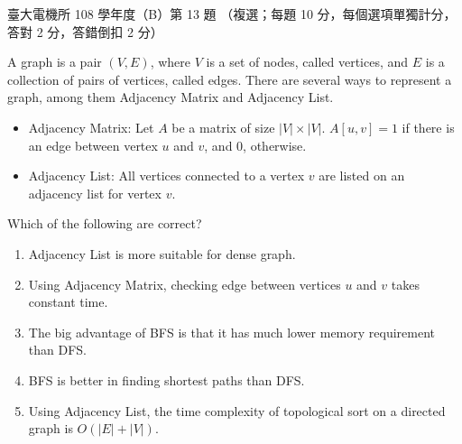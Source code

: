 \begin{pastexam}[label={px:ntu-108-ee-dsb-13}]{臺大電機所 108 學年度（B）第 13 題}
（複選；每題 10 分，每個選項單獨計分，答對 2 分，答錯倒扣 2 分）

A graph is a pair $(V,E)$, where $V$ is a set of nodes, called vertices, and $E$ is a collection of
pairs of vertices, called edges. There are several ways to represent a graph, among them Adjacency
Matrix and Adjacency List.
\begin{itemize}
\item Adjacency Matrix: Let $A$ be a matrix of size $|V|\times|V|$. $A[u,v]=1$ if there is an edge
between vertex $u$ and $v$, and 0, otherwise.
\item Adjacency List: All vertices connected to a vertex $v$ are listed on an adjacency list for
vertex $v$.
\end{itemize}
Which of the following are correct?
\begin{enumerate}[label=(\Alph*).]
\item Adjacency List is more suitable for dense graph.
\item Using Adjacency Matrix, checking edge between vertices $u$ and $v$ takes constant time.
\item The big advantage of BFS is that it has much lower memory requirement than DFS.
\item BFS is better in finding shortest paths than DFS.
\item Using Adjacency List, the time complexity of topological sort on a directed graph is
$O(|E|+|V|)$.
\end{enumerate}
\end{pastexam}

